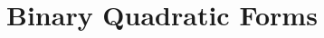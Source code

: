\documentclass[../notes.tex]{subfiles}
\begin{document}
\section{Binary Quadratic Forms}
\end{document}
